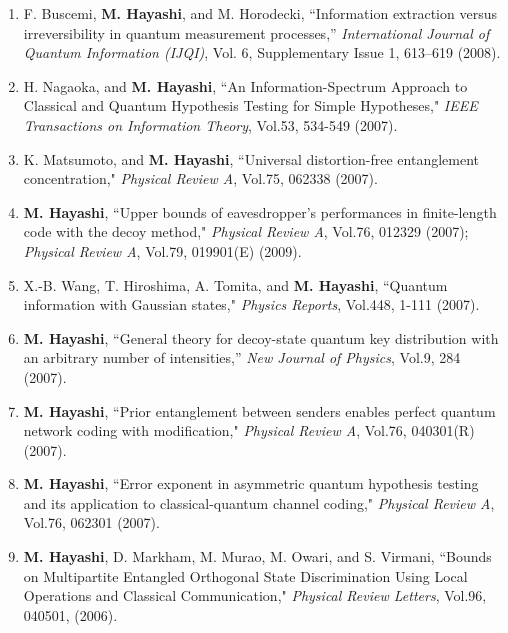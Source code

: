 \documentclass[a4paper,12pt,oneside]{article}
\begin{document}
\begin{enumerate}
\item F. Buscemi, \textbf{M. Hayashi}, and M. Horodecki, 
``Information extraction versus irreversibility in quantum measurement processes,''
{\em International Journal of Quantum Information (IJQI)}, 
Vol. 6, Supplementary Issue 1, 613--619 (2008). 

\item
H. Nagaoka, and \textbf{M. Hayashi}, ``An Information-Spectrum Approach to Classical and Quantum Hypothesis Testing for Simple Hypotheses," 
{\em IEEE Transactions on Information Theory}, Vol.53, 534-549 (2007).

\item
K. Matsumoto, and \textbf{M. Hayashi}, ``Universal distortion-free entanglement concentration," 
{\em Physical Review A}, Vol.75, 062338 (2007).

\item 
\textbf{M. Hayashi}, ``Upper bounds of eavesdropper's performances in finite-length code with the decoy method," 
{\em Physical Review A}, Vol.76, 012329 (2007); 
{\em Physical Review A}, Vol.79, 019901(E) (2009).

\item
X.-B. Wang, T. Hiroshima, A. Tomita, and \textbf{M. Hayashi}, ``Quantum information with Gaussian states," 
{\em Physics Reports}, Vol.448, 1-111 (2007).

\item
\textbf{M. Hayashi}, ``General theory for decoy-state quantum key distribution with an arbitrary number of intensities,'' 
{\em New Journal of Physics}, Vol.9, 284 (2007).

\item
\textbf{M. Hayashi}, ``Prior entanglement between senders enables perfect quantum network coding with modification," 
{\em Physical Review A}, Vol.76, 040301(R) (2007).

\item
\textbf{M. Hayashi}, ``Error exponent in asymmetric quantum hypothesis testing and its application to classical-quantum channel coding,"
{\em Physical Review A}, Vol.76, 062301 (2007).

\item 
\textbf{M. Hayashi}, D. Markham, M. Murao, M. Owari, and S. Virmani, 
``Bounds on Multipartite Entangled Orthogonal State Discrimination Using Local Operations and Classical Communication," 
{\em Physical Review Letters}, Vol.96, 040501, (2006).


\end{enumerate}
\end{document}
